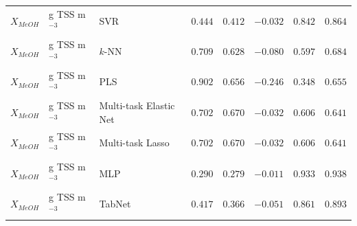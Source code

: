 \begin{longtable}{llp{3.1cm}rrrrr}
$X_{MeOH}$ & g TSS m$^{-3}$ & SVR & $0.444$ & $0.412$ & $-0.032$ & $0.842$ & $0.864$ \\
$X_{MeOH}$ & g TSS m$^{-3}$ & $k$-NN & $0.709$ & $0.628$ & $-0.080$ & $0.597$ & $0.684$ \\
$X_{MeOH}$ & g TSS m$^{-3}$ & PLS & $0.902$ & $0.656$ & $-0.246$ & $0.348$ & $0.655$ \\
$X_{MeOH}$ & g TSS m$^{-3}$ & Multi-task Elastic Net & $0.702$ & $0.670$ & $-0.032$ & $0.606$ & $0.641$ \\
$X_{MeOH}$ & g TSS m$^{-3}$ & Multi-task Lasso & $0.702$ & $0.670$ & $-0.032$ & $0.606$ & $0.641$ \\
$X_{MeOH}$ & g TSS m$^{-3}$ & MLP & $0.290$ & $0.279$ & $-0.011$ & $0.933$ & $0.938$ \\
$X_{MeOH}$ & g TSS m$^{-3}$ & TabNet & $0.417$ & $0.366$ & $-0.051$ & $0.861$ & $0.893$ \\
\end{longtable}

